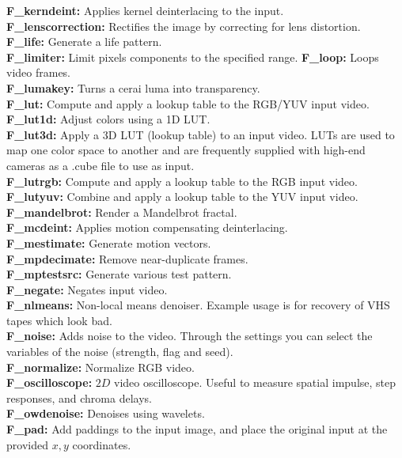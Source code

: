 \textbf{F\_kerndeint:} Applies kernel deinterlacing to the input.\\
\textbf{F\_lenscorrection:} Rectifies the image by correcting for lens distortion.\\
\textbf{F\_life:} Generate a life pattern.\\
\textbf{F\_limiter:} Limit pixels components to the specified range.
\textbf{F\_loop:} Loops video frames.\\
\textbf{F\_lumakey:} Turns a cerai luma into transparency.\\
\textbf{F\_lut:} Compute and apply a lookup table to the RGB/YUV input video.
\textbf{F\_lut1d:} Adjust colors using a 1D LUT.\\
\textbf{F\_lut3d:} Apply a 3D LUT (lookup table) to an input video. LUTs are used to map one color space to another and are frequently supplied with high-end cameras as a .cube file to use as input.\\
\textbf{F\_lutrgb:} Compute and apply a lookup table to the RGB input video.\\
\textbf{F\_lutyuv:} Combine and apply a lookup table to the YUV input video.\\
\textbf{F\_mandelbrot:} Render a Mandelbrot fractal.\\
\textbf{F\_mcdeint:} Applies motion compensating deinterlacing.\\
\textbf{F\_mestimate:} Generate motion vectors.\\
\textbf{F\_mpdecimate:} Remove near-duplicate frames.\\
\textbf{F\_mptestsrc:} Generate various test pattern.\\
\textbf{F\_negate:} Negates input video.\\
\textbf{F\_nlmeans:} Non-local means denoiser. Example usage is for recovery of VHS tapes which look bad.\\
\textbf{F\_noise:} Adds noise to the video. Through the settings you can select the variables of the noise (strength, flag and seed).\\
\textbf{F\_normalize:} Normalize RGB video.\\
\textbf{F\_oscilloscope:} $2D$ video oscilloscope. Useful to measure spatial impulse, step responses, and chroma delays.\\
\textbf{F\_owdenoise:} Denoises using wavelets.\\
\textbf{F\_pad:} Add paddings to the input image, and place the original input at the provided $x, y$ coordinates.\\
